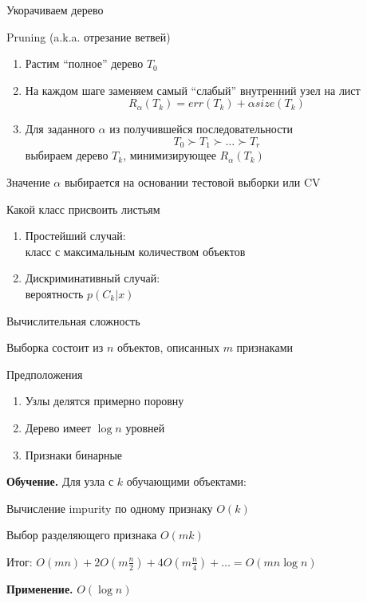 \documentclass[10pt]{beamer}
\begin{document}
\begin{frame}{Укорачиваем дерево}

Pruning (a.k.a. отрезание ветвей)
\begin{enumerate}
\item Растим ``полное'' дерево $T_0$
\item На каждом шаге заменяем самый ``слабый'' внутренний узел на лист
\[
R_{\alpha}(T_k) = err(T_k) + \alpha size(T_k)
\]
\item Для заданного $\alpha $ из получившейся последовательности 
\[
T_0 \succ T_1 \succ \ldots \succ T_r
\]
выбираем дерево $T_k$, минимизирующее $R_{\alpha}(T_k)$
\end{enumerate}
Значение $\alpha$  выбирается на основании тестовой выборки или CV

\end{frame}


\begin{frame}{Какой класс присвоить листьям}

\begin{enumerate}
\item Простейший случай: \\ класс с максимальным количеством объектов
\item Дискриминативный случай: \\ вероятность $p(C_k | x)$
\end{enumerate}

\end{frame}


\begin{frame}{Вычислительная сложность}

Выборка состоит из $n$ объектов, описанных $m$ признаками

\vspace{1em}
Предположения
\begin{enumerate}
\item Узлы делятся примерно поровну
\item Дерево имеет $\log n$ уровней
\item Признаки бинарные
\end{enumerate}

\vspace{1em}
{\bf Обучение. } Для узла с $k$ обучающими объектами:

\vspace{1em}
\hspace{1em}Вычисление impurity по одному признаку $O(k)$

\hspace{1em}Выбор разделяющего признака $O(mk)$ 

\hspace{1em}Итог: $O(mn) + 2 O(m \frac{n}{2}) + 4 O(m \frac{n}{4}) + \ldots = O(m n \log n)$

\vspace{1em}
{\bf Применение. } $O(\log n)$

\end{frame}
\end{document}

